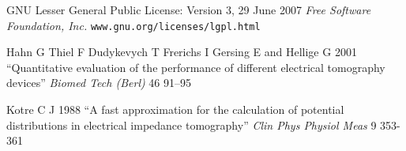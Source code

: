 \documentclass[12pt]{iopart}
\begin{document}
\item[]
GNU Lesser General Public License: Version 3, 29 June 2007
{\em Free Software Foundation, Inc.}
\verb+www.gnu.org/licenses/lgpl.html+

\item[]
Hahn G Thiel F Dudykevych T Frerichs I Gersing E
and Hellige G 2001
``Quantitative evaluation of the performance of
different electrical tomography devices''
{\em  Biomed Tech (Berl)}
46 91--95


\item[]
Kotre C J 1988
``A fast approximation for the calculation of potential distributions in electrical impedance tomography''
{\em Clin Phys Physiol Meas}
9 353-361
\endrefs
\end{document}
